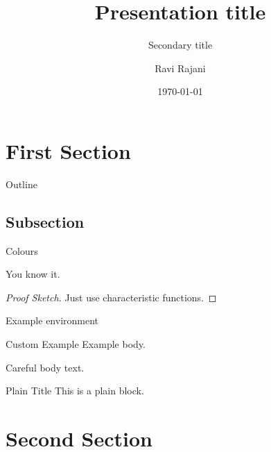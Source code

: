\documentclass[notes=onslide]{slides} %
\title
{Presentation title}
\subtitle
{Secondary title}
\author
{Ravi Rajani}
\institute
{Department of Mathematics}
\date{\today}
\begin{document}
\begin{frame}
  \titlepage
\end{frame}

\section{First Section}

\begin{frame}{Outline}
  \tableofcontents[currentsection]
\end{frame}

\subsection{Subsection}

\begin{frame}{Colours}
\begin{theorem}
You know it. 
\end{theorem}
\begin{proof}[Proof Sketch]
Just use characteristic functions.
\end{proof}
\begin{example}
Example environment
\end{example}
\begin{minipage}{.5\textwidth}
  \begin{exampleblock}{Custom Example}
    Example body.
    \end{exampleblock}
\end{minipage}
\begin{alertblock}{Careful}
  body text.
\end{alertblock}
\begin{plainblock}{Plain Title}
This is a plain block.
\end{plainblock}
\end{frame}

\section{Second Section}
\end{document}
